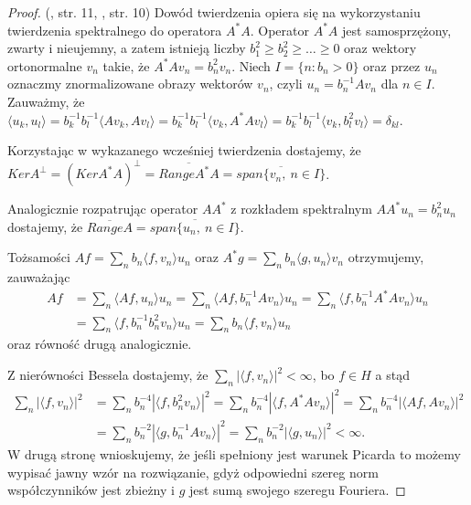 \documentclass[man,mfiu]{mgrwms}
\begin{document}
\begin{proof}(\cite{kaipo}, str. 11, \cite{szkutnik}, str. 10) Dowód twierdzenia opiera się na wykorzystaniu twierdzenia spektralnego do operatora $A^*A$. Operator $A^*A$ jest samosprzężony, zwarty i nieujemny, a zatem istnieją liczby $b_1^2\geq b_2^2\geq\dots\geq 0$ oraz wektory ortonormalne $v_n$ takie, że $A^*Av_n=b_n^2v_n$. Niech $I=\{n\colon b_n>0\}$ oraz przez $u_n$ oznaczmy znormalizowane obrazy wektorów $v_n$, czyli $u_n=b_n^{-1}Av_n$ dla $n\in I$. Zauważmy, że $\langle u_k,u_l\rangle=b_k^{-1}b_l^{-1}\langle Av_k, Av_l\rangle=b_k^{-1}b_l^{-1}\langle v_k,A^*Av_l\rangle=b_k^{-1}b_l^{-1}\langle v_k,b_l^2v_l\rangle=\delta_{kl}$.

Korzystając w wykazanego wcześniej twierdzenia dostajemy, że $KerA^{\perp}=(KerA^*A)^{\perp}=\overline{RangeA^*A}=\overline{span\{v_n,\ n\in I\}}$.

Analogicznie rozpatrując operator $AA^*$ z rozkładem spektralnym $AA^*u_n=b_n^2u_n$ dostajemy, że $\overline{RangeA}=\overline{span\{u_n,\ n\in I\}}$.

Tożsamości $Af=\sum_nb_n\langle f, v_n\rangle u_n$ oraz $A^*g=\sum_nb_n\langle g, u_n\rangle v_n$ otrzymujemy, zauważając
\begin{displaymath}
\begin{split}
Af&=\sum_n\langle Af,u_n\rangle u_n=\sum_n\langle Af, b_n^{-1}Av_n\rangle u_n= \sum_n\langle f,b_n^{-1}A^*Av_n\rangle u_n\\ &=\sum_n\langle f,b_n^{-1}b_n^2v_n\rangle u_n=\sum_n b_n\langle f,v_n\rangle u_n
\end{split}
\end{displaymath} oraz równość drugą analogicznie.

Z nierówności Bessela dostajemy, że $\sum_n|\langle f, v_n\rangle |^2<\infty$, bo $f\in H$ a stąd
\begin{displaymath}
\begin{split}
\sum_n|\langle f,v_n\rangle|^2&=\sum_nb_n^{-4}|\langle f,b_n^2v_n\rangle|^2=\sum_nb_n^{-4}|\langle f, A^*Av_n\rangle|^2=\sum_nb_n^{-4}|\langle Af,Av_n\rangle|^2\\
&=\sum_nb_n^{-2}|\langle g, b_n^{-1}Av_n\rangle|^2=\sum_nb_n^{-2}|\langle g, u_n\rangle|^2<\infty.
\end{split}
\end{displaymath}
W drugą stronę wnioskujemy, że jeśli spełniony jest warunek Picarda to możemy wypisać jawny wzór na rozwiązanie,  gdyż odpowiedni szereg norm współczynników jest zbieżny i $g$ jest sumą swojego szeregu Fouriera.


\end{proof}
\end{document}
